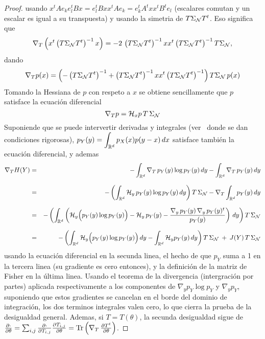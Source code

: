 \begin{proof}
  usando $x^t A e_k e_l^t  B x = e_l^t B x x^t A e_k =  e_k^t A^t x x^t B^t e_l$
  (escalares  comutan y  un  escalar es  igual  a su  transpuesta)  y usando  la
  simetria de  $T \Sigma_{\mathcal{N}} T^t$.   Eso significa que
  \[
  \nabla_T \left( x^t \left( T \Sigma_{\mathcal{N}} T^t \right)^{-1} x \right) = - 2 \,
  \left(  T \Sigma_{\mathcal{N}}  T^t \right)^{-1}  x  x^t \left(  T \Sigma_{\mathcal{N}}  T^t
  \right)^{-1} T \Sigma_{\mathcal{N}},
  \]
  dando
  \[
  \nabla_T p(x)  = \left( - \left(  T \Sigma_{\mathcal{N}} T^t \right)^{-1}  + \left( T
      \Sigma_{\mathcal{N}}  T^t   \right)^{-1}  x   x^t  \left(  T   \Sigma_{\mathcal{N}}  T^t
    \right)^{-1} \right) T \Sigma_{\mathcal{N}} \, p(x)
  \]
  Tomando la Hessiana de $p$ con  respeto a $x$ se obtiene sencillamente que $p$
  satisface  la  ecuaci\'on  diferencial
  \[
  \nabla_T p = \mathcal{H}_x p \, T \, \Sigma_{\mathcal{N}}
  \]
  Suponiende que  se puede intervertir derivadas  y integrales (ver~\cite{Bar84,
    Bar86}  donde  se  dan   condiciones  rigorosas),  $\displaystyle  p_Y(y)  =
  \int_{\mathbb{R}^d}  p_X(x)  p(y-x)  \,   dx$  satisface  tambi\'en  la  ecuaci\'on
  diferencial, y ademas
  \begin{eqnarray*}
  \nabla_T H(Y) & = & - \int_{\mathbb{R}^d} \nabla_T \, p_Y(y) \log p_Y(y)
  \, dy - \int_{\mathbb{R}^d} \nabla_T \, p_Y(y) \, dy\\[2.5mm]
  & = & - \left( \int_{\mathbb{R}^d} \mathcal{H}_y \, p_Y(y) \log p_Y(y) \, dy \right) T \,
  \Sigma_{\mathcal{N}} - \nabla_T \int_{\mathbb{R}^d} p_Y(y) \, dy\\[2.5mm]
  & = & - \left( \int_{\mathbb{R}^d} \left( \mathcal{H}_y \Big( p_Y(y) \log p_Y(y) \Big) -
  \mathcal{H}_y \, p_Y(y) - \frac{\nabla_y \, p_Y(y) \, \nabla_y \, p_Y(y)^t}{p_Y(y)}
  \right) \, dy \right) T \, \Sigma_{\mathcal{N}}\\[2.5mm]
  & = & - \left( \int_{\mathbb{R}^d} \mathcal{H}_y \Big( p_Y(y) \log p_Y(y) \Big) \, dy -
  \int_{\mathbb{R}^d} \mathcal{H}_y p_Y(y) \, dy \right) T \, \Sigma_{\mathcal{N}} \: + \: J(Y) \, T
  \, \Sigma_{\mathcal{N}}
  \end{eqnarray*}
  usando la  ecuaci\'on diferencial en la  secunda linea, el hecho  de que $p_Y$
  suma  a  1  en  la  tercera  linea  (su gradiente  es  cero  entonces),  y  la
  definici\'on de la matriz de Fisher en la \'ultima linea. Usando el teorema de
  la  divergencia (intergraci\'on  por  partes) aplicada  respectivamente a  los
  componentes de $\nabla_y p_Y \log  p_Y$ y $\nabla_y p_Y$, suponiendo que estos
  gradientes  se cancelan  en el  borde del  dominio de  integraci\'on,  los dos
  terminos  integrales valen cero,  lo que  cierra la  prueba de  la desigualdad
  general.   Ademas,  si  $T  =  T(\theta)$, la  secunda  desigualdad  sigue  de
  $\frac{\partial   \cdot}{\partial    \theta}   =   \sum_{i,j}   \frac{\partial
    \cdot}{\partial   T_{i,j}}   \frac{\partial   T_{i,j}}{\partial  \theta}   =
  \operatorname{Tr}\left( \nabla_T \, \frac{\partial T^t}{\partial \theta} \right)$.
\end{proof}

